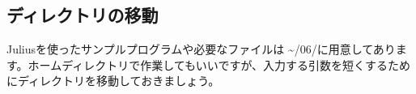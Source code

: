 \subsection{ディレクトリの移動}
Juliusを使ったサンプルプログラムや必要なファイルは \textasciitilde /06/に用意してあります。ホームディレクトリで作業してもいいですが、入力する引数を短くするためにディレクトリを移動しておきましょう。\\

\begin{tcolorbox}[title=\useOmetoi]
\begin{enumerate}
\end{enumerate}
\end{tcolorbox}
